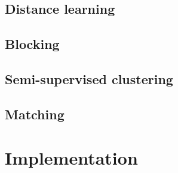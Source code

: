 \documentclass{article}
\begin{document}

\subsection{Distance learning}

\subsection{Blocking}

\subsection{Semi-supervised clustering}

\subsection{Matching}



\section{Implementation}
\label{implementation}


\end{document}
